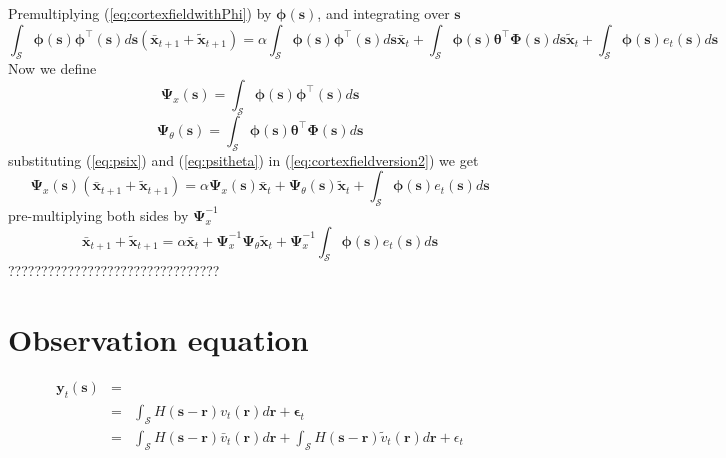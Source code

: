 \documentclass[a4paper,12pt]{article}
\begin{document}
Premultiplying (\ref{eq:cortexfieldwithPhi}) by $\boldsymbol\phi(\mathbf s) $, and integrating over $\mathbf s$
\begin{equation}
\int_{\mathcal S} \boldsymbol\phi(\mathbf s)\boldsymbol \phi^{\top}(\mathbf s)d\mathbf s(\bar{\mathbf x}_{t+1}+\tilde{\mathbf x}_{t+1})=\alpha\int_{\mathcal S} \boldsymbol\phi(\mathbf s)\boldsymbol \phi^{\top}(\mathbf s)d\mathbf s \bar{\mathbf x}_{t}+\int_{\mathcal S} \boldsymbol\phi(\mathbf s)\boldsymbol \theta^{\top}\boldsymbol\Phi(\mathbf s)d\mathbf s\tilde{\mathbf x}_t+\int_{\mathcal S} \boldsymbol\phi(\mathbf s)e_t(\mathbf s)d\mathbf s
\label{eq:cortexfieldversion2}
\end{equation}
Now we define
\begin{equation}
 \boldsymbol\Psi_x(\mathbf s)=\int_{\mathcal S}\boldsymbol\phi(\mathbf s)\boldsymbol\phi^{\top}(\mathbf s)d\mathbf s
\label{eq:psix}
\end{equation}
\begin{equation}
  \boldsymbol\Psi_{\theta}(\mathbf s)=\int_{\mathcal S} \boldsymbol\phi(\mathbf s)\boldsymbol \theta^{\top}\boldsymbol\Phi(\mathbf s)d\mathbf s
\label{eq:psitheta}
\end{equation}
substituting (\ref{eq:psix}) and (\ref{eq:psitheta}) in (\ref{eq:cortexfieldversion2}) we get
\begin{equation}
\boldsymbol\Psi_x(\mathbf s)(\bar{\mathbf x}_{t+1}+\tilde{\mathbf x}_{t+1})=\alpha\boldsymbol\Psi_x(\mathbf s) \bar{\mathbf x}_{t}+\boldsymbol\Psi_{\theta}(\mathbf s)\tilde{\mathbf x}_t+\int_{\mathcal S} \boldsymbol\phi(\mathbf s)e_t(\mathbf s)d\mathbf s
\end{equation}
pre-multiplying both sides by $\boldsymbol\Psi_x^{-1}$
\begin{equation}
\bar{\mathbf x}_{t+1}+\tilde{\mathbf x}_{t+1}=\alpha\bar{\mathbf x}_{t}+\boldsymbol\Psi_x^{-1}\boldsymbol\Psi_{\theta}\tilde{\mathbf x}_t+\boldsymbol\Psi_x^{-1}\int_{\mathcal S} \boldsymbol\phi(\mathbf s)e_t(\mathbf s)d\mathbf s
\end{equation}
????????????????????????????????
\section*{Observation equation}
\begin{eqnarray}
 \mathbf y_t(\mathbf s)&=&\\
&=&\int_{\mathcal S}H(\mathbf s-\mathbf r)v_t(\mathbf r)d\mathbf r+\boldsymbol\epsilon_t \\
&=&\int_{\mathcal S}H(\mathbf s-\mathbf r)\bar v_t(\mathbf r)d\mathbf r+\int_{\mathcal S}H(\mathbf s-\mathbf r)\tilde v_t(\mathbf r)d\mathbf r+\epsilon_t
\label{eq:observationequation}
\end{eqnarray}
\end{document}
